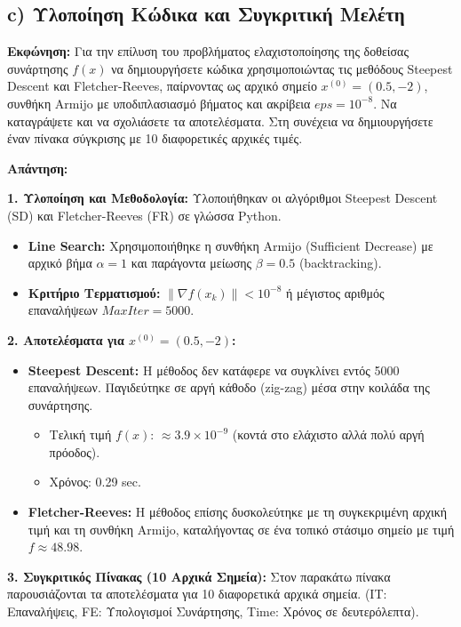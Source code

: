 \documentclass[a4paper,12pt]{article}
\begin{document}
\subsection*{c) Υλοποίηση Κώδικα και Συγκριτική Μελέτη}

\textbf{Εκφώνηση:}
Για την επίλυση του προβλήματος ελαχιστοποίησης της δοθείσας συνάρτησης $f(x)$ να δημιουργήσετε κώδικα χρησιμοποιώντας τις μεθόδους Steepest Descent και Fletcher-Reeves, παίρνοντας ως αρχικό σημείο $x^{(0)} = (0.5, -2)$, συνθήκη Armijo με υποδιπλασιασμό βήματος και ακρίβεια $eps = 10^{-8}$. Να καταγράψετε και να σχολιάσετε τα αποτελέσματα. Στη συνέχεια να δημιουργήσετε έναν πίνακα σύγκρισης με 10 διαφορετικές αρχικές τιμές.

\textbf{Απάντηση:}

\textbf{1. Υλοποίηση και Μεθοδολογία:}
Υλοποιήθηκαν οι αλγόριθμοι Steepest Descent (SD) και Fletcher-Reeves (FR) σε γλώσσα Python.
\begin{itemize}
    \item \textbf{Line Search:} Χρησιμοποιήθηκε η συνθήκη Armijo (Sufficient Decrease) με αρχικό βήμα $\alpha=1$ και παράγοντα μείωσης $\beta=0.5$ (backtracking).
    \item \textbf{Κριτήριο Τερματισμού:} $\|\nabla f(x_k)\| < 10^{-8}$ ή μέγιστος αριθμός επαναλήψεων $MaxIter=5000$.
\end{itemize}

\textbf{2. Αποτελέσματα για $x^{(0)} = (0.5, -2)$:}
\begin{itemize}
    \item \textbf{Steepest Descent:} Η μέθοδος δεν κατάφερε να συγκλίνει εντός 5000 επαναλήψεων. Παγιδεύτηκε σε αργή κάθοδο (zig-zag) μέσα στην κοιλάδα της συνάρτησης.
    \begin{itemize}
        \item Τελική τιμή $f(x)$: $\approx 3.9 \times 10^{-9}$ (κοντά στο ελάχιστο αλλά πολύ αργή πρόοδος).
        \item Χρόνος: 0.29 sec.
    \end{itemize}
    \item \textbf{Fletcher-Reeves:} Η μέθοδος επίσης δυσκολεύτηκε με τη συγκεκριμένη αρχική τιμή και τη συνθήκη Armijo, καταλήγοντας σε ένα τοπικό στάσιμο σημείο με τιμή $f \approx 48.98$.
\end{itemize}

\textbf{3. Συγκριτικός Πίνακας (10 Αρχικά Σημεία):}
Στον παρακάτω πίνακα παρουσιάζονται τα αποτελέσματα για 10 διαφορετικά αρχικά σημεία.
(IT: Επαναλήψεις, FE: Υπολογισμοί Συνάρτησης, Time: Χρόνος σε δευτερόλεπτα).
\end{document}
